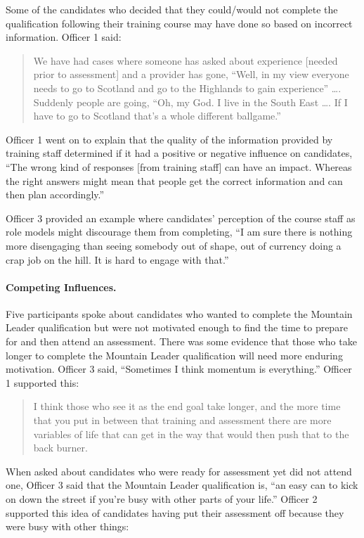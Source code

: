 \documentclass[
  12pt,
  a4paper,
]{book}
\begin{document}
Some of the candidates who decided that they could/would not complete the qualification following their training course may have done so based on incorrect information. Officer 1 said:

\begin{quote}
We have had cases where someone has asked about experience {[}needed prior to assessment{]} and a provider has gone, ``Well, in my view everyone needs to go to Scotland and go to the Highlands to gain experience'' \ldots. Suddenly people are going, ``Oh, my God. I live in the South East \ldots. If I have to go to Scotland that's a whole different ballgame.''
\end{quote}

Officer 1 went on to explain that the quality of the information provided by training staff determined if it had a positive or negative influence on candidates, ``The wrong kind of responses {[}from training staff{]} can have an impact. Whereas the right answers might mean that people get the correct information and can then plan accordingly.''

Officer 3 provided an example where candidates' perception of the course staff as role models might discourage them from completing, ``I am sure there is nothing more disengaging than seeing somebody out of shape, out of currency doing a crap job on the hill. It is hard to engage with that.''

\hypertarget{competing-influences.}{%
\paragraph{Competing Influences.}\label{competing-influences.}}

Five participants spoke about candidates who wanted to complete the Mountain Leader qualification but were not motivated enough to find the time to prepare for and then attend an assessment. There was some evidence that those who take longer to complete the Mountain Leader qualification will need more enduring motivation. Officer 3 said, ``Sometimes I think momentum is everything.'' Officer 1 supported this:

\begin{quote}
I think those who see it as the end goal take longer, and the more time that you put in between that training and assessment there are more variables of life that can get in the way that would then push that to the back burner.
\end{quote}

When asked about candidates who were ready for assessment yet did not attend one, Officer 3 said that the Mountain Leader qualification is, ``an easy can to kick on down the street if you're busy with other parts of your life.'' Officer 2 supported this idea of candidates having put their assessment off because they were busy with other things:
\end{document}
